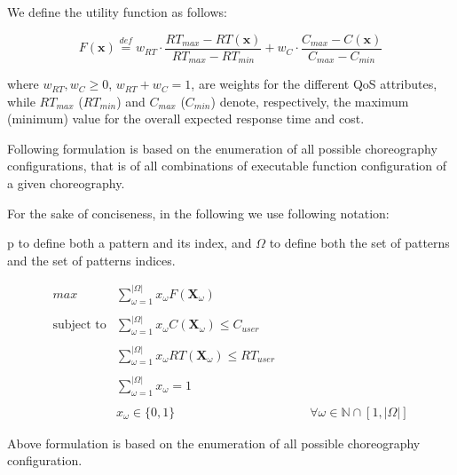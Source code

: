 \documentclass[10pt,a4paper]{report}
\newcommand*{\N}{\mathbb{N}}
\newcommand{\mathDef}{\overset{\textit{def}}{=}}
\theoremstyle{definition}
\begin{document}
We define the utility function as follows:

\begin{equation}
	F(\textbf{x}) \mathDef w_{RT} \cdot \dfrac{RT_{max} - RT(\textbf{x})}{RT_{max} - RT_{min}} + w_{C} \cdot \dfrac{C_{max} - C(\textbf{x})}{C_{max} - C_{min}}
\end{equation}

where $w_{RT}, w_{C} \geq 0$, $w_{RT} + w_{C} = 1$, are weights for the different QoS attributes, while $RT_{max}$ ($RT_{min}$) and $C_{max}$ ($C_{min}$) denote, respectively, the maximum (minimum) value for the overall expected response time and cost.


Following formulation is based on the enumeration of all possible choreography configurations, that is of all combinations of executable function configuration of a given choreography.

For the sake of conciseness, in the following we use following notation: 

p to define both a pattern and its index, and $\Omega$ to define both the set of patterns and the
set of patterns indices.



\begin{equation}
	\begin{array} {rll} 
		\displaystyle max & \displaystyle \sum_{\omega = 1}^{|\Omega|} x_{\omega} F(\textbf{X}_{\omega}) \\\\
		
		\text{subject to} & \displaystyle \sum_{\omega = 1}^{|\Omega|} x_{\omega} C(\textbf{X}_{\omega}) \leq C_{user} \\\\
		
		& \displaystyle \sum_{\omega = 1}^{|\Omega|} x_{\omega} RT(\textbf{X}_{\omega}) \leq RT_{user} \\\\ 
		
		& \displaystyle \sum_{\omega = 1}^{|\Omega|} x_{\omega} = 1 & \\\\
		
		
		& x_{\omega} \in \lbrace 0, 1 \rbrace & \qquad \forall \omega \in \N \cap [1,|\Omega|]
	\end{array}
\end{equation}

Above formulation is based on the enumeration of all possible choreography configuration.
\end{document}
